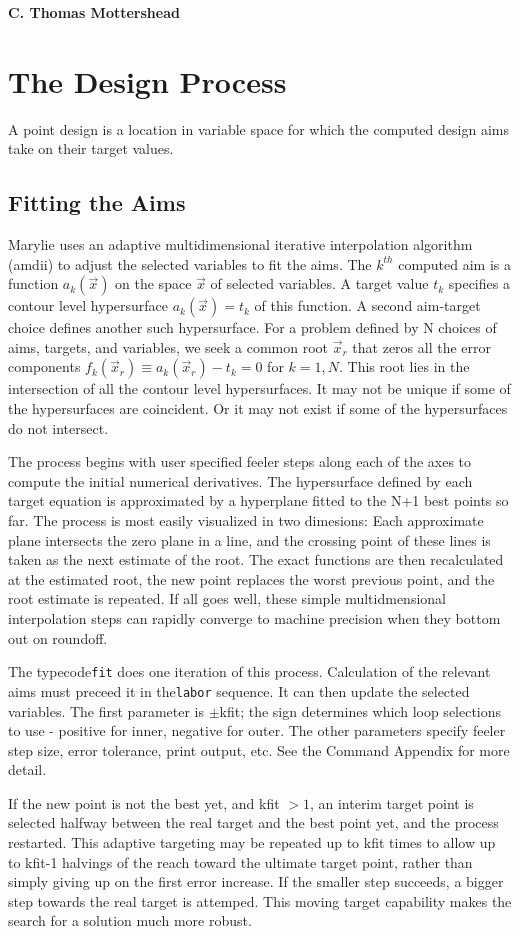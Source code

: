 \documentclass[11pt]{article} %
\newcommand{\sub}{\subsection}
\newcommand{\vb}{\verb ;}
\begin{document}
\begin{center}  {\bf C. Thomas Mottershead }
\section {\bf The Design Process} 
 
A point design is a location in variable space for which the computed design aims take on their target values. 

\sub{Fitting the Aims}
Marylie uses an adaptive multidimensional iterative interpolation algorithm ({\sc amdii}) to adjust the selected variables to fit the aims. The $k^{th}$ computed aim is a function $a_k({\vec x})$ on the space $\vec x$ of selected variables. A target value $t_k$ specifies a contour level hypersurface $a_k({\vec x})=t_k$ of this function. A second aim-target choice defines another such hypersurface. For a problem defined by N choices of aims, targets, and variables, we seek a common root $\vec x_r$ that zeros all the error components $f_k({\vec x_r}) \equiv a_k({\vec x_r})-t_k =0$ for $k=1,N$. This root lies in the intersection of all the contour level hypersurfaces. It may not be unique if some of the hypersurfaces are coincident. Or it may not exist if some of the hypersurfaces do not intersect.
 
The process begins with user specified feeler steps along each of the axes to compute the initial numerical derivatives. The hypersurface defined by each target equation is approximated by a hyperplane fitted to the N+1 best points so far. The process is most easily visualized in two dimesions: Each approximate plane intersects the zero plane in a line, and the crossing point of these lines is taken as the next estimate of the root. The exact functions are then recalculated at the estimated root, the new point replaces the worst previous point, and the root estimate is repeated. If all goes well, these simple multidmensional interpolation steps can rapidly converge to machine precision when they bottom out on roundoff.
 
The typecode\vb fit; does one iteration of this process. Calculation of the relevant aims must preceed it in the\vb labor; sequence. It can then update the selected variables. The first parameter is $\pm${\sc kfit}; the sign determines which loop selections to use - positive for inner, negative for outer. The other parameters specify feeler step size, error tolerance, print output, etc. See the Command Appendix for more detail.


If the new point is not the best yet, and {\sc kfit} $>1$, an interim target point is selected halfway between the real target and the best point yet, and the process restarted. This adaptive targeting may be repeated up to {\sc kfit} times to allow up to {\sc kfit-1} halvings of the reach toward the ultimate target point, rather than simply giving up on the first error increase. If the smaller step succeeds, a bigger step towards the real target is attemped. This moving target capability makes the search for a solution much more robust.



\end{center}
\end{document}
